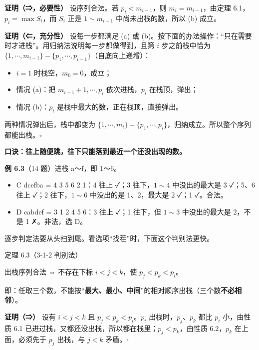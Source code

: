 \documentclass[10.5pt,a4paper,oneside]{article}
\newcommand{\hlred}[1]{\textcolor{wdred}{\bfseries #1}}
\providecommand{\tightlist}{\setlength{\itemsep}{2pt}\setlength{\parskip}{0pt}}
\begin{document}
\textbf{证明（⇒，必要性）} 设序列合法。若 \(p_i<m_{i-1}\)，则
\(m_i=m_{i-1}\)，由定理 6.1，\(p_i=\max S_i\)，而 \(S_i\) 正是
\(1\sim m_{i-1}\) 中尚未出栈的数，所以 (b) 成立。

\textbf{证明（⇐，充分性）} 设每一步都满足 (a) 或
(b)。按下面的办法操作：“只在需要时才进栈”。用归纳法说明每一步都做得到，且第
\(i\) 步之前栈中恰为
\(\{1,\cdots,m_{i-1}\}-\{p_1,\cdots,p_{i-1}\}\)（自底向上递增）：

\begin{itemize}
\tightlist
\item
  \(i=1\) 时栈空，\(m_0=0\)，成立；
\item
  情况 (a)：把 \(m_{i-1}+1,\cdots,p_i\) 依次进栈，\(p_i\) 在栈顶，弹出；
\item
  情况 (b)：\(p_i\) 是栈中最大的数，正在栈顶，直接弹出。
\end{itemize}

两种情况弹出后，栈中都变为
\(\{1,\cdots,m_i\}-\{p_1,\cdots,p_i\}\)，归纳成立。所以整个序列都能出栈。\(\square\)

\hlred{口诀：往上随便跳，往下只能落到最近一个还没出现的数。}

\textbf{例 6.3}（14 题）进栈 a～f，即 1～6。

\begin{itemize}
\tightlist
\item
  C dcefba = 4 3 5 6 2 1：4 往上 ✓；3 往下，\(1\sim4\) 中没出的最大是 3
  ✓；5、6 往上 ✓；2 往下，\(1\sim6\) 中没出的是 1、2，最大是 2 ✓；1
  ✓。合法。
\item
  D cabdef = 3 1 2 4 5 6：3 往上 ✓；1 往下，但 \(1\sim3\) 中没出的最大是
  2，不是 1 ✗。非法，选 D。
\end{itemize}

逐步判定法要从头扫到尾。看选项“找茬”时，下面这个判别法更快。

\begin{thmbox}{定理 6.3（3-1-2 判别法）}

出栈序列合法 ⇔ 不存在下标 \(i<j<k\)，使 \(p_j<p_k<p_i\)。

即：任取三个数，不能按“\textbf{最大、最小、中间}”的相对顺序出栈（三个数\textbf{不必相邻}）。

\end{thmbox}

\textbf{证明（⇒）} 设有 \(i<j<k\) 且 \(p_j<p_k<p_i\)。\(p_i\)
出栈时，\(p_j\)、\(p_k\) 都比 \(p_i\) 小，由性质 6.1
已进过栈，又都还没出栈，所以都在栈里；\(p_j<p_k\)，由性质 6.2，\(p_k\)
在上面，必须先于 \(p_j\) 出栈，与 \(j<k\) 矛盾。\(\square\)
\end{document}
